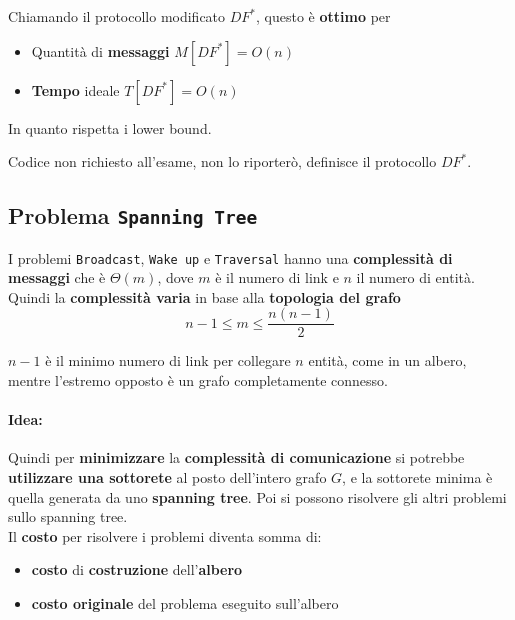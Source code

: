 Chiamando il protocollo modificato $DF^\ast$, questo è \textbf{ottimo} per
\begin{itemize}
	\item Quantità di \textbf{messaggi} $M[DF^\ast] = O(n)$
	\item \textbf{Tempo} ideale $T[DF^\ast] = O(n)$
\end{itemize}

In quanto rispetta i lower bound.\\

\vfill

Codice non richiesto all'esame, non lo riporterò, definisce il protocollo $DF^\ast$.\\


\newpage

\subsection{Problema \texttt{Spanning Tree}}

I problemi \texttt{Broadcast}, \texttt{Wake up} e \texttt{Traversal} hanno una \textbf{complessità di messaggi} che è $\Theta (m)$, dove $m$ è il numero di link e $n$ il numero di entità.\\

Quindi la \textbf{complessità varia} in base alla \textbf{topologia del grafo}
$$ n-1 \leq m \leq \frac{n(n-1)}{2} $$

$n-1$ è il minimo numero di link per collegare $n$ entità, come in un albero, mentre l'estremo opposto è un grafo completamente connesso.\\

\paragraph{Idea:} Quindi per \textbf{minimizzare} la \textbf{complessità di comunicazione} si potrebbe \textbf{utilizzare una sottorete} al posto dell'intero grafo $G$, e la sottorete minima è quella generata da uno \textbf{spanning tree}. Poi si possono risolvere gli altri problemi sullo spanning tree.\\

Il \textbf{costo} per risolvere i problemi diventa somma di: 
\begin{itemize}
	\item \textbf{costo} di \textbf{costruzione} dell'\textbf{albero} 
	\item \textbf{costo originale} del problema eseguito sull'albero
\end{itemize}

